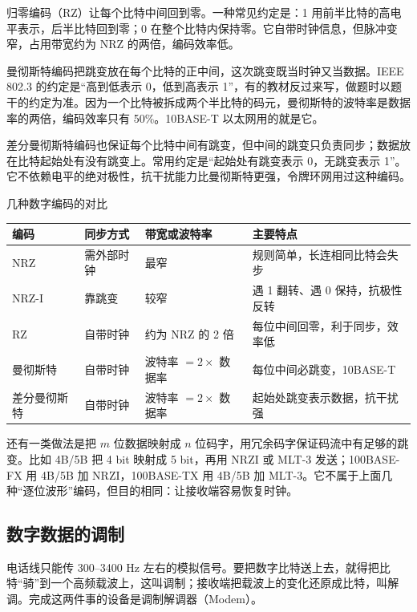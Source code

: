 归零编码（RZ）让每个比特中间回到零。一种常见约定是：1 用前半比特的高电平表示，后半比特回到零；0 在整个比特内保持零。它自带时钟信息，但脉冲变窄，占用带宽约为 NRZ 的两倍，编码效率低。

曼彻斯特编码把跳变放在每个比特的正中间，这次跳变既当时钟又当数据。IEEE 802.3 的约定是“高到低表示 0，低到高表示 1”，有的教材反过来写，做题时以题干的约定为准。因为一个比特被拆成两个半比特的码元，曼彻斯特的波特率是数据率的两倍，编码效率只有 50\%。10BASE-T 以太网用的就是它。

差分曼彻斯特编码也保证每个比特中间有跳变，但中间的跳变只负责同步；数据放在比特起始处有没有跳变上。常用约定是“起始处有跳变表示 0，无跳变表示 1”。它不依赖电平的绝对极性，抗干扰能力比曼彻斯特更强，令牌环网用过这种编码。

\begin{tablebox}{几种数字编码的对比}
\centering
\small
\begin{tabularx}{\linewidth}{|p{2.4cm}|p{2.0cm}|p{3.2cm}|X|}
\hline
编码 & 同步方式 & 带宽或波特率 & 主要特点 \\
\hline
NRZ & 需外部时钟 & 最窄 & 规则简单，长连相同比特会失步 \\
NRZ-I & 靠跳变 & 较窄 & 遇 1 翻转、遇 0 保持，抗极性反转 \\
RZ & 自带时钟 & 约为 NRZ 的 2 倍 & 每位中间回零，利于同步，效率低 \\
曼彻斯特 & 自带时钟 & 波特率 $=2\times$ 数据率 & 每位中间必跳变，10BASE-T \\
差分曼彻斯特 & 自带时钟 & 波特率 $=2\times$ 数据率 & 起始处跳变表示数据，抗干扰强 \\
\hline
\end{tabularx}
\end{tablebox}

还有一类做法是把 $m$ 位数据映射成 $n$ 位码字，用冗余码字保证码流中有足够的跳变。比如 4B/5B 把 4 bit 映射成 5 bit，再用 NRZI 或 MLT-3 发送；100BASE-FX 用 4B/5B 加 NRZI，100BASE-TX 用 4B/5B 加 MLT-3。它不属于上面几种“逐位波形”编码，但目的相同：让接收端容易恢复时钟。

\subsection{数字数据的调制}

电话线只能传 300--3400 Hz 左右的模拟信号。要把数字比特送上去，就得把比特“骑”到一个高频载波上，这叫调制；接收端把载波上的变化还原成比特，叫解调。完成这两件事的设备是调制解调器（Modem）。

